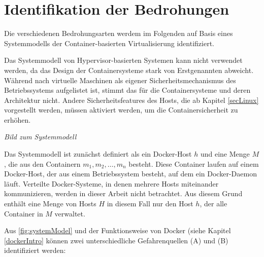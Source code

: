 \documentclass[../main.tex]{subfiles}
\begin{document}
  \section{Identifikation der Bedrohungen}
    Die verschiedenen Bedrohungsarten werdem im Folgenden auf Basis eines Systemmodells der Container-basierten Virtualisierung identifiziert.

    Das Systemmodell von Hypervisor-basierten Systemen kann nicht verwendet werden, da das Design der Containersysteme stark von Erstgenannten abweicht. Während nach \cite[S.125]{CISSP} virtuelle Maschinen als eigener Sicherheitsmechanismus des Betriebssystems aufgelistet ist, stimmt das für die Containersysteme und deren Architektur nicht. Andere Sicherheitsfeatures des Hosts, die ab Kapitel \ref{secLinux} vorgestellt werden, müssen aktiviert werden, um die Containersicherheit zu erhöhen.

    \emph{Bild zum Systemmodell}

    Das Systemmodell ist zunächst definiert als ein Docker-Host \(h\) und eine Menge \(M\), die aus den Containern \(m_1,m_2,\dotsc,m_n\) besteht. Diese Container laufen auf einem Docker-Host, der aus einem Betriebssystem besteht, auf dem ein Docker-Daemon läuft. Verteilte Docker-Systeme, in denen mehrere Hosts miteinander kommunizieren, werden in dieser Arbeit nicht betrachtet. Aus diesem Grund enthält eine Menge von Hosts \(H\) in diesem Fall nur den Host \(h\), der alle Container in \(M\) verwaltet.

    Aus \fig \ref{fig:systemModel} und der Funktionsweise von Docker (siehe Kapitel \ref{dockerIntro} können zwei unterschiedliche Gefahrenquellen (A) und (B) identifiziert werden:
\end{document}
